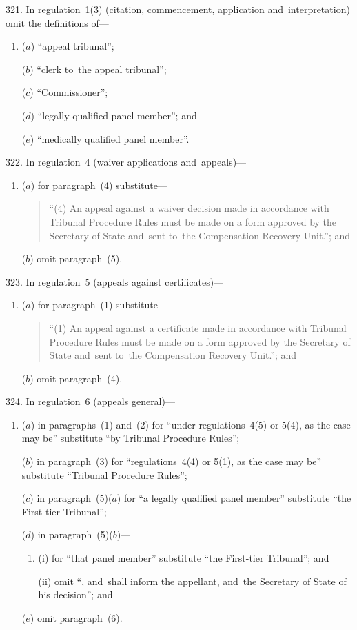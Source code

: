 \documentclass[12pt,a4paper]{article}
\begin{document}
\medskip

321.  In regulation~1(3) (citation, commencement, application and~interpretation) omit the definitions of—
\begin{enumerate}\item[]
($a$) “appeal tribunal”;

($b$) “clerk to~the appeal tribunal”;

($c$) “Commissioner”;

($d$) “legally qualified panel member”; and

($e$) “medically qualified panel member”.
\end{enumerate}

\medskip

322.  In regulation~4 (waiver applications and~appeals)—
\begin{enumerate}\item[]
($a$) for paragraph~(4) substitute—
\begin{quotation}
“(4) An appeal against a waiver decision made in accordance with Tribunal Procedure Rules must be made on a form approved by the Secretary of State and~sent to~the Compensation Recovery Unit.”; and
\end{quotation}

($b$) omit paragraph~(5).
\end{enumerate}

\medskip

323.  In regulation~5 (appeals against certificates)—
\begin{enumerate}\item[]
($a$) for paragraph~(1) substitute—
\begin{quotation}
“(1) An appeal against a certificate made in accordance with Tribunal Procedure Rules must be made on a form approved by the Secretary of State and~sent to~the Compensation Recovery Unit.”; and
\end{quotation}

($b$) omit paragraph~(4).
\end{enumerate}

\medskip

324.  In regulation~6 (appeals general)—
\begin{enumerate}\item[]
($a$) in paragraphs~(1) and~(2) for “under regulations~4(5) or 5(4), as the case may be” substitute “by Tribunal Procedure Rules”;

($b$) in paragraph~(3) for “regulations~4(4) or 5(1), as the case may be” substitute “Tribunal Procedure Rules”;

($c$) in paragraph~(5)($a$)  for “a legally qualified panel member” substitute “the First-tier Tribunal”;

($d$) in paragraph~(5)($b$)—
\begin{enumerate}\item[]
(i) for “that panel member” substitute “the First-tier Tribunal”; and

(ii) omit “, and~shall inform the appellant, and~the Secretary of State of his decision”; and
\end{enumerate}

($e$) omit paragraph~(6).
\end{enumerate}
\end{document}
